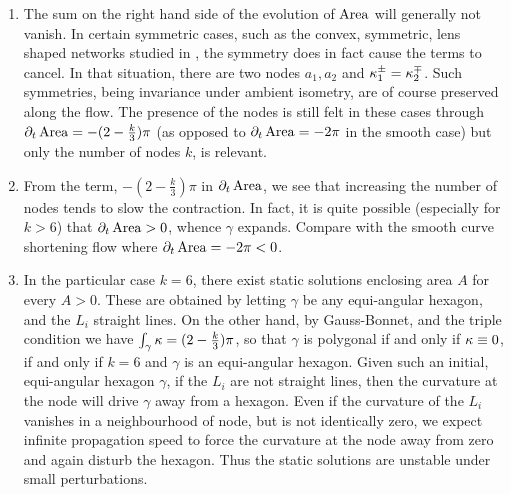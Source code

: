 \documentclass[11pt]{amsart}
\begin{document}
\begin{remark}
\begin{enumerate}
\item The sum on the right hand side of the evolution of \(\operatorname{Area}\) will generally not vanish. In certain symmetric cases, such as the convex, symmetric, lens shaped networks studied in \cite{MR2763716}, the symmetry does in fact cause the terms to cancel. In that situation, there are two nodes \(a_1, a_2\) and \(\operatorname{\kappa}^{\pm}_1 = \operatorname{\kappa}^{\mp}_2\). Such symmetries, being invariance under ambient isometry, are of course preserved along the flow. The presence of the nodes is still felt in these cases through \(\partial_t \operatorname{Area} = -(2- \tfrac{k}{3})\pi\) (as opposed to \(\partial_t \operatorname{Area} = - 2\pi\) in the smooth case) but only the number of nodes \(k\), is relevant.

\item From the term, \(-(2- \tfrac{k}{3})\pi\) in \(\partial_t \operatorname{Area}\), we see that increasing the number of nodes tends to slow the contraction. In fact, it is quite possible (especially for \(k > 6\)) that \(\partial_t \operatorname{Area} > 0\), whence \(\gamma\) expands. Compare with the smooth curve shortening flow where \(\partial_t \operatorname{Area} = - 2\pi < 0\).

\item In the particular case \(k = 6\), there exist static solutions enclosing area \(A\) for every \(A > 0\). These are obtained by letting \(\gamma\) be any equi-angular hexagon, and the \(L_i\) straight lines. On the other hand, by Gauss-Bonnet, and the triple condition we have \(\int_{\gamma} \operatorname{\kappa} = (2 - \tfrac{k}{3}) \pi\), so that \(\gamma\) is polygonal if and only if \(\operatorname{\kappa} \equiv 0\), if and only if \(k = 6\) and \(\gamma\) is an equi-angular hexagon. Given such an initial, equi-angular hexagon \(\gamma\), if the \(L_i\) are not straight lines, then the curvature at the node will drive \(\gamma\) away from a hexagon. Even if the curvature of the \(L_i\) vanishes in a neighbourhood of node, but is not identically zero, we expect infinite propagation speed to force the curvature at the node away from zero and again disturb the hexagon. Thus the static solutions are unstable under small perturbations.

\end{enumerate}
\end{remark}
\end{document}
